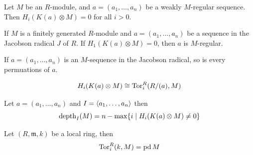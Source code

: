 \begin{theorem}
	\label{thm:reg_seq_implies_koszul_exact}
	Let $M$ be an $R$-module, and $a = (a_1, \dots, a_n)$ be a weakly $M$-regular sequence.
	Then $H_i(K(a) \otimes M) = 0$ for all $i > 0$.
\end{theorem}

\begin{lemma}
	\label{lem:reg_in_jrad_iff_koszul_exact_at_one}
	If $M$ is a finitely generated $R$-module and $a = (a_1, \dots, a_n)$ be a sequence in the Jacobson radical $J$ of $R$.
	If $H_1(K(a) \otimes M) = 0$, then $a$ is $M$-regular.
\end{lemma}

\begin{corollary}
	\label{cor:perm_of_reg_seq_in_jrad_is_reg}
	If $a = (a_1, \dots, a_n)$ is an $M$-sequence in the Jacobson radical, so is every permuations of $a$.
\end{corollary}

\begin{lemma}
	\label{thm:KoszulComplex_res_quotient_ring}
\end{lemma}

\begin{lemma}
	\label{lem:tor_measures_koszul_homology}
	$$H_i(K(a) \otimes M) \cong \operatorname{Tor}_i^R (R/(a), M)$$
\end{lemma}

\begin{lemma}
	\label{lem:koszul_homology_mesures_depth}
	Let $a = (a_1, \dots, a_n)$ and $I = \langle a_1, \dots, a_n\rangle$ then
	$$\operatorname{depth}_I(M) = n - \max\{i \mid H_i(K(a) \otimes M) \neq 0\}$$
\end{lemma}

\begin{lemma}
	\label{lem:tor_eq_pd_if_local}
	Let $(R, \mathfrak{m}, k)$ be a local ring, then
	$$\operatorname{Tor}_i^R(k, M) = \operatorname{pd} M$$
\end{lemma}

\begin{proposition}
	\label{prop:globdim_eq_projdim_of_residue}
\end{proposition}

